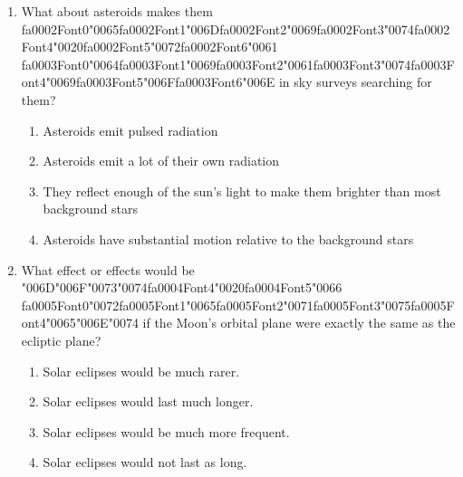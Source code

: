 \documentclass[12pt]{article}
\begin{document}
\begin{enumerate}[label=\arabic*.]
\begin{enumerate}[label=(\alph*)]
    \item Carbonate minerals indicating a thicker warmer Martian atmosphere
    \item Amino acids with a preferred orientation or "chirality"
\end{enumerate}
\item What about asteroids makes them {\csname fa0002Font0\endcsname\char"0065}{\csname fa0002Font1\endcsname\char"006D}{\csname fa0002Font2\endcsname\char"0069}{\csname fa0002Font3\endcsname\char"0074}{\csname fa0002Font4\endcsname\char"0020}{\csname fa0002Font5\endcsname\char"0072}{\csname fa0002Font6\endcsname\char"0061} {\csname fa0003Font0\endcsname\char"0064}{\csname fa0003Font1\endcsname\char"0069}{\csname fa0003Font2\endcsname\char"0061}{\csname fa0003Font3\endcsname\char"0074}{\csname fa0003Font4\endcsname\char"0069}{\csname fa0003Font5\endcsname\char"006F}{\csname fa0003Font6\endcsname\char"006E} in sky surveys searching for them?
\begin{enumerate}[label=(\alph*)]
    \item Asteroids emit pulsed radiation
    \item Asteroids emit a lot of their own radiation
    \item They reflect enough of the sun's light to make them brighter than most background stars
    \item Asteroids have substantial motion relative to the background stars
\end{enumerate}
\item What effect or effects would be {\char"006D}{\char"006F}{\char"0073}{\char"0074}{\csname fa0004Font4\endcsname\char"0020}{\csname fa0004Font5\endcsname\char"0066} {\csname fa0005Font0\endcsname\char"0072}{\csname fa0005Font1\endcsname\char"0065}{\csname fa0005Font2\endcsname\char"0071}{\csname fa0005Font3\endcsname\char"0075}{\csname fa0005Font4\endcsname\char"0065}{\char"006E}{\char"0074} if the Moon's orbital plane were exactly
the same as the ecliptic plane?
\begin{enumerate}[label=(\alph*)]
    \item Solar eclipses would be much rarer.
    \item Solar eclipses would last much longer.
    \item Solar eclipses would be much more frequent.
    \item Solar eclipses would not last as long.
\end{enumerate}
\end{enumerate}
\end{document}
